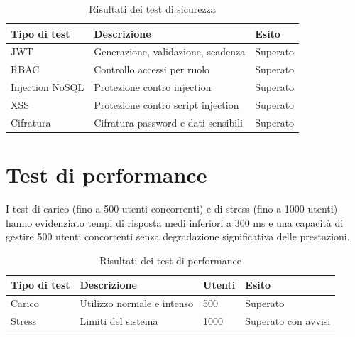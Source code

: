 \begin{table}[H]
    \centering
    \caption{Risultati dei test di sicurezza}
    \label{tab:risultati-test-sicurezza}
    \renewcommand{\arraystretch}{1.3}
    \begin{tabular}{|p{4.5cm}|p{7.5cm}|p{2.5cm}|}
        \hline
        \textbf{Tipo di test} & \textbf{Descrizione} & \textbf{Esito} \\
        \hline
        JWT & Generazione, validazione, scadenza & Superato \\
        \hline
        RBAC & Controllo accessi per ruolo & Superato \\
        \hline
        Injection NoSQL & Protezione contro injection & Superato \\
        \hline
        XSS & Protezione contro script injection & Superato \\
        \hline
        Cifratura & Cifratura password e dati sensibili & Superato \\
        \hline
    \end{tabular}
\end{table}

\section{Test di performance}
\label{sec:test-performance}

I test di carico (fino a 500 utenti concorrenti) e di stress (fino a 1000 utenti) hanno evidenziato tempi di risposta medi inferiori a 300 ms e una capacità di gestire 500 utenti concorrenti senza degradazione significativa delle prestazioni.

\begin{table}[H]
    \centering
    \caption{Risultati dei test di performance}
    \label{tab:risultati-test-performance}
    \renewcommand{\arraystretch}{1.3}
    \begin{tabular}{|p{3.5cm}|p{6.5cm}|p{2.5cm}|p{2cm}|}
        \hline
        \textbf{Tipo di test} & \textbf{Descrizione} & \textbf{Utenti} & \textbf{Esito} \\
        \hline
        Carico & Utilizzo normale e intenso & 500 & Superato \\
        \hline
        Stress & Limiti del sistema & 1000 & Superato con avvisi \\
        \hline
    \end{tabular}
\end{table}

